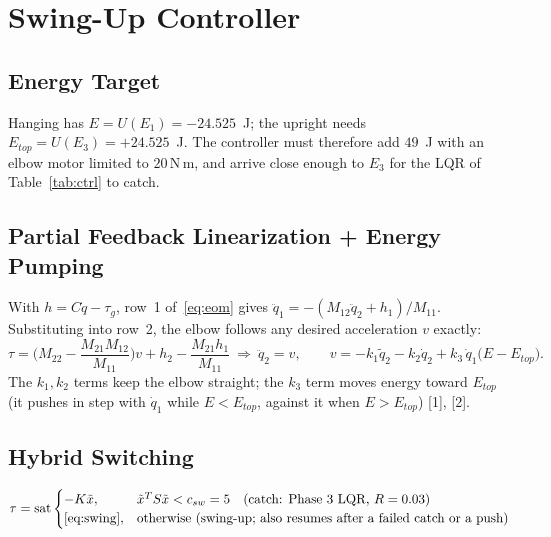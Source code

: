 \documentclass[10pt,letterpaper]{article}
\newcommand{\Nm}{\,\mathrm{N\,m}}
\newenvironment{keep}{\par\noindent\begin{minipage}{\linewidth}}{\end{minipage}\par\smallskip}
\begin{document}
\begin{keep}
\section{Swing-Up Controller}
\subsection{Energy Target}
Hanging has $E=U(E_1)=-24.525$~J; the upright needs $E_{top}=U(E_3)=+24.525$~J. The controller must therefore add $49$~J with an elbow motor limited to $20\Nm$, and arrive close enough to $E_3$ for the LQR of Table~\ref{tab:ctrl} to catch.
\end{keep}

\begin{keep}
\subsection{Partial Feedback Linearization + Energy Pumping}
With $h=C\dot q-\tau_g$, row~1 of~\eqref{eq:eom} gives $\ddot q_1=-(M_{12}\ddot q_2+h_1)/M_{11}$. Substituting into row~2, the elbow follows any desired acceleration $v$ exactly:
\begin{equation}
\tau=\Big(M_{22}-\frac{M_{21}M_{12}}{M_{11}}\Big)v+h_2-\frac{M_{21}h_1}{M_{11}}\ \Rightarrow\ \ddot q_2=v,\qquad
v=-k_1\tilde q_2-k_2\dot q_2+k_3\,\dot q_1\big(E-E_{top}\big).\label{eq:swing}
\end{equation}
The $k_1,k_2$ terms keep the elbow straight; the $k_3$ term moves energy toward $E_{top}$ (it pushes in step with $\dot q_1$ while $E<E_{top}$, against it when $E>E_{top}$) [1], [2].
\end{keep}

\begin{keep}
\subsection{Hybrid Switching}
\begin{equation}
\tau=\operatorname{sat}\begin{cases}-K\tilde x, & \tilde x^TS\tilde x<c_{sw}=5\quad(\text{catch: Phase 3 LQR, }R=0.03)\\ \text{\eqref{eq:swing}}, & \text{otherwise (swing-up; also resumes after a failed catch or a push)}\end{cases}\label{eq:hybrid}
\end{equation}
\end{keep}
\end{document}
